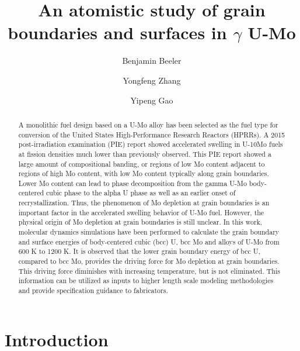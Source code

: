 \documentclass[review]{elsarticle}
\begin{document}
\begin{frontmatter}
\title{An atomistic study of grain boundaries and surfaces in $\gamma$ U-Mo}

\author[inl]{Benjamin Beeler}
\author[inl]{Yongfeng Zhang}
\author[inl]{Yipeng Gao}
\address[inl]{Idaho National Laboratory, Idaho Falls, ID 83415}


\begin{abstract}
A monolithic fuel design based on a U-Mo alloy has been selected as the fuel type for conversion of the United States High-Performance Research Reactors (HPRRs). A 2015 post-irradiation examination (PIE) report showed accelerated swelling in U-10Mo fuels at fission densities much lower than previously observed. This PIE report showed a large amount of compositional banding, or regions of low Mo content adjacent to regions of high Mo content, with low Mo content typically along grain boundaries. Lower Mo content can lead to phase decomposition from the gamma U-Mo body-centered cubic phase to the alpha U phase as well as an earlier onset of recrystallization. Thus, the phenomenon of Mo depletion at grain boundaries is an important factor in the accelerated swelling behavior of U-Mo fuel. However, the physical origin of Mo depletion at grain boundaries is still unclear. In this work, molecular dynamics simulations have been performed to calculate the grain boundary and surface energies of body-centered cubic (bcc) U, bcc Mo and alloys of U-Mo from 600 K to 1200 K. It is observed that the lower grain boundary energy of bcc U, compared to bcc Mo, provides the driving force for Mo depletion at grain boundaries. This driving force diminishes with increasing temperature, but is not eliminated. This information can be utilized as inputs to higher length scale modeling methodologies and provide specification guidance to fabricators.
\end{abstract}
\end{frontmatter}

\linenumbers
\modulolinenumbers[5]

\section{Introduction}
\end{document}

